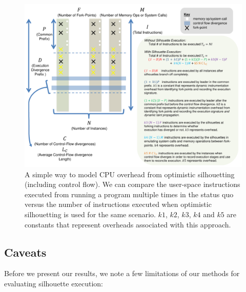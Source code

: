 \begin{figure}
  \centering
  \includegraphics[scale=0.75, trim=3cm 0cm 1cm 0cm]{calc3.pdf}
  \caption[Modeling CPU overhead from optimistic silhouetting (excluding control flow)]%
          {A simple way to model CPU overhead from optimistic silhouetting (including control flow).
            We can compare the user-space instructions executed from running
            a program multiple times in the status quo
            versus the number of instructions executed
            when optimistic silhouetting is used for
            the same scenario. $k1$, $k2$, $k3$, $k4$ and $k5$ 
            are constants that represent overheads
            associated with this approach.}
  \label{oscoverhead}
\end{figure}

\subsection{Caveats}
Before we present our results, we
note a few limitations of our
methods for evaluating 
silhouette execution:

